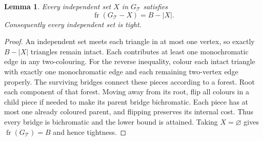 \documentclass[11pt]{article}
\newtheorem{lemma}[theorem]{Lemma}
\newcommand{\fr}{\operatorname{fr}}
\begin{document}
\begin{lemma}\label{lem:deletion}
Every independent set $X$ in $G_{\mathcal T}$ satisfies
\[
 \fr(G_{\mathcal T}-X)=B-|X|.
\]
Consequently every independent set is tight.
\end{lemma}
\begin{proof}
An independent set meets each triangle in at most one vertex, so exactly
$B-|X|$ triangles remain intact. Each contributes at least one
monochromatic edge in any two-colouring. For the reverse inequality,
colour each intact triangle with exactly one monochromatic edge and
each remaining two-vertex edge properly. The surviving bridges connect
these pieces according to a forest. Root each component of that forest.
Moving away from its root, flip all colours in a child piece if needed
to make its parent bridge bichromatic. Each piece has at most one
already coloured parent, and flipping preserves its internal cost.
Thus every bridge is bichromatic and the lower bound is attained.
Taking $X=\varnothing$ gives $\fr(G_{\mathcal T})=B$ and hence tightness.
\end{proof}
\end{document}
